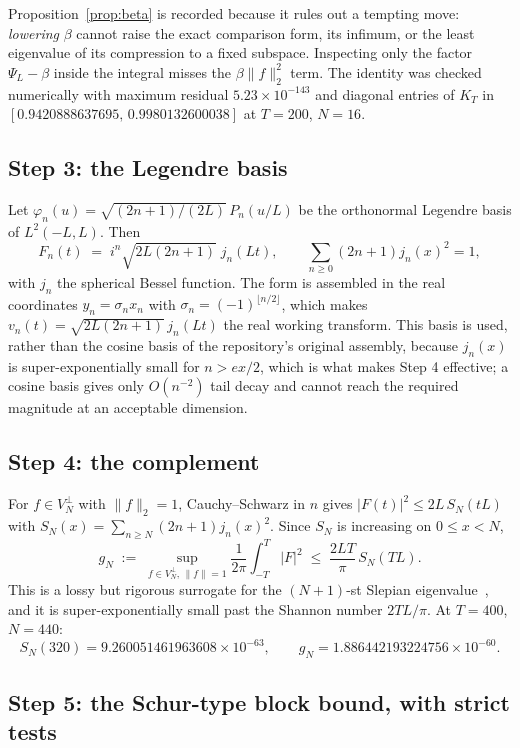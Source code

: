 \documentclass[11pt,a4paper]{article}
\theoremstyle{definition}
\theoremstyle{remark}
\newcommand{\PsiL}{\Psi_{L}}
\begin{document}
Proposition~\ref{prop:beta} is recorded because it rules out a tempting move:
\emph{lowering} $\beta$ cannot raise the exact comparison form, its infimum, or
the least eigenvalue of its compression to a fixed subspace. Inspecting only the
factor $\PsiL - \beta$ inside the integral misses the $\beta\|f\|_2^2$ term. The
identity was checked numerically with maximum residual $5.23\times10^{-143}$ and
diagonal entries of $K_T$ in $[0.9420888637695,\, 0.9980132600038]$ at $T=200$,
$N=16$.

\subsection{Step 3: the Legendre basis}

Let $\varphi_n(u) = \sqrt{(2n+1)/(2L)}\, P_n(u/L)$ be the orthonormal Legendre
basis of $L^2(-L,L)$. Then
\[
   F_n(t) \;=\; i^n \sqrt{2L(2n+1)}\; j_n(Lt) ,
   \qquad \sum_{n \ge 0}(2n+1) j_n(x)^2 = 1 ,
\]
with $j_n$ the spherical Bessel function. The form is assembled in the real
coordinates $y_n = \sigma_n x_n$ with $\sigma_n = (-1)^{\lfloor n/2 \rfloor}$,
which makes $v_n(t) = \sqrt{2L(2n+1)}\,j_n(Lt)$ the real working transform. This
basis is used, rather than the cosine basis of the repository's original
assembly, because $j_n(x)$ is super-exponentially small for $n > ex/2$, which is
what makes Step 4 effective; a cosine basis gives only $O(n^{-2})$ tail decay
and cannot reach the required magnitude at an acceptable dimension.

\subsection{Step 4: the complement}

For $f \in V_N^{\perp}$ with $\|f\|_2 = 1$, Cauchy--Schwarz in $n$ gives
$|F(t)|^2 \le 2L\, S_N(tL)$ with $S_N(x) = \sum_{n \ge N}(2n+1)j_n(x)^2$. Since
$S_N$ is increasing on $0 \le x < N$,
\[
   g_N \;:=\; \sup_{f \in V_N^{\perp},\, \|f\|=1}
     \frac{1}{2\pi}\int_{-T}^{T}|F|^2
   \;\le\; \frac{2LT}{\pi}\, S_N(TL) .
\]
This is a lossy but rigorous surrogate for the $(N+1)$-st Slepian
eigenvalue~\cite{Slepian},
and it is super-exponentially small past the Shannon number $2TL/\pi$. At
$T = 400$, $N = 440$:
\[
   S_N(320) = 9.260051461963608\times10^{-63},
   \qquad
   g_N = 1.886442193224756\times10^{-60}.
\]

\subsection{Step 5: the Schur-type block bound, with strict tests}
\end{document}
